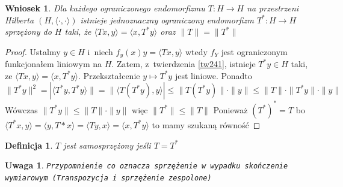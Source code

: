 \documentclass[11pt]{mwrep}
\renewcommand{\[}{\begin{equation}}
\renewcommand{\]}{\end{equation}}
\newcommand{\scal}{\langle \cdot,\cdot \rangle}
\newtheorem{wn}[subsection]{Wniosek}
\newtheorem{uwaga}[subsection]{Uwaga}
\newtheorem{de}[subsection]{Definicja}
\begin{document}
\begin{wn}
	Dla każdego ograniczonego endomorfizmu $T\colon H\to H$ na przestrzeni Hilberta $(H, \scal)$ istnieje jednoznaczny ograniczony endomorfizm 
	$T^*\colon H\to H$ sprzężony do $H$ taki, że $\langle T x ,y  \rangle = \langle x, T^* y \rangle$ oraz $\|T\| = \|T^*\|$
\end{wn}
\begin{proof}
	Ustalmy $y \in H$ i~niech $f_y(x)y = \langle Tx ,y \rangle$ wtedy $f_Y$ jest ograniczonym funkcjonałem liniowym na $H$. 
	Zatem, z~twierdzenia \ref{tw241}, istnieje $T^*y \in H$ taki, ze $\langle Tx ,y  \rangle=\langle x, T^* y  \rangle$. 
	Przekształcenie $y \mapsto T^*y $ jest liniowe. 
	Ponadto 
	$$\|T^* y\|^2 = |\langle T^* y, T^* y \rangle \| = \|\langle T(T^* y), y \rangle| \le 
	\|T(T^*y)\|\cdot \|y\|\le \|T\| \cdot \|T^* y\| \cdot \|y\|$$
	Wówczas $\|T^* y \| \le \|T\|\cdot \|y\|$ więc $\|T^*\|\le\|T\|$
	Ponieważ $(T^*)^* = T$ bo $\langle T^*x,y  \rangle = \langle y, T*x \rangle = \langle T y , x \rangle = \langle x, T^* y \rangle$
	to mamy szukaną równość

\end{proof}
\begin{de}
	$T$ jest samosprzężony jeśli $T= T^*$ 
\end{de}
\begin{uwaga}
	\texttt{Przypomnienie co oznacza sprzężenie w~wypadku skończenie wymiarowym (Transpozycja i~sprzężenie zespolone)}
\end{uwaga}
\end{document}
